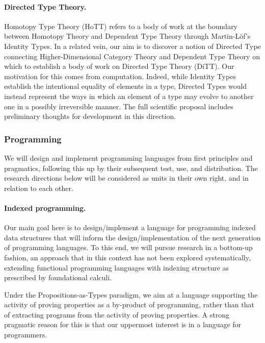 \documentclass[11pt,twocolumn]{article}
\newcommand{\hl}[1]{#1}%
\begin{document}
\paragraph{Directed Type Theory.}
\label{DirectedTypeTheoryParagraph}

Homotopy Type Theory (HoTT) refers to a body of work at the boundary between
Homotopy Theory and Dependent Type Theory through Martin-L\"of's Identity
Types. %
In a related vein, our \hl{aim} is to discover a notion of Directed Type
connecting Higher-Dimensional Category Theory and Dependent Type Theory on
which to establish a body of work on Directed Type Theory (DiTT).  Our
\hl{motivation} for this comes from computation.  Indeed, while Identity
Types establish the intentional equality of elements in a type, Directed Types
would instead represent the ways in which an element of a type may evolve to
another one in a possibly irreversible manner.  The full scientific proposal
includes preliminary thoughts for development in this direction.

\subsubsection{Programming}
\label{Programming}

We will design and implement programming languages from first principles and
pragmatics, following this up by their subsequent test, use, and distribution.
The research directions below will be considered as units in their own right,
and in relation to each other.

\paragraph{Indexed programming.}
\label{IndexedProgrammingParagraph}

Our main \hl{goal} here is to design/implement a language for programming
indexed data structures that will inform the design/implementation of the next
generation of programming languages.  To this end, we will pursue
\hl{research} in a bottom-up fashion, an approach that in this context has not
been explored systematically, extending functional programming languages with
indexing structure as prescribed by foundational calculi.

Under the Propositions-as-Types paradigm, we \hl{aim} at a language
supporting the activity of proving properties as a by-product of programming,
rather than that of extracting programs from the activity of proving
properties.  A strong pragmatic reason for this is that our uppermost interest
is in a language for programmers. 
\end{document}
